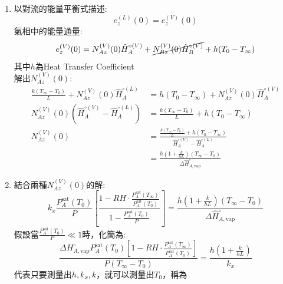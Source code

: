 \documentclass[../main.tex]{subfiles}
\begin{document}
\begin{itemize}
\begin{enumerate}
\begin{align}
        \frac{1 - RH \cdot \frac{P_A^{\text{sat}}(T_\infty)}{P_A^{\text{sat}}(T_0)}
      }{1 - \frac{P_A^{\text{sat}}(T_0)}{P}}
      \right] \label{eq:ch4_6_mass_thermal_N_Az_final}
    \end{align}
    \item 以對流的能量平衡式描述:
    \begin{equation}
      e_z^{(L)}(0) = e_z^{(V)}(0)
    \end{equation}
    氣相中的能量通量:
    \begin{equation}
      e_z^{(V)}(0) = N_{Az}^{(V)}(0) \hat H_A^{\circ (V)} + \cancel{N_{Bz}^{(V)}(0) \hat H_B^{\circ (V)}}
      + h(T_0 - T_\infty)
    \end{equation}
    其中$h$為Heat Transfer Coefficient\\
    解出$ N_{Az}^{(V)}(0)$:
    \begin{align}
      \frac{k(T_\infty - T_0)}{L} + N_{Az}^{(V)}(0)\hat H_A^{\circ (L)} 
      &=h(T_0 - T_\infty)+ N_{Az}^{(V)}(0) \hat H_A^{\circ (V)} \nonumber\\
      N_{Az}^{(V)}(0) \left(\hat H_A^{\circ (V)} - \hat H_A^{\circ (L)}\right)
      &= \frac{k(T_\infty - T_0)}{L} + h(T_0 - T_\infty) \nonumber\\
      N_{Az}^{(V)}(0) &= \frac{\frac{k(T_\infty - T_0)}{L} + h(T_0 - T_\infty)}
      {\hat H_A^{\circ (V)} - \hat H_A^{\circ (L)}} \nonumber\\
      &= \frac{h\left(
        1+\frac{k}{hL}
      \right)\left(
        T_\infty - T_0
      \right)}{\Delta \hat H_{A,\text{vap}}^{\circ}}
    \end{align}
    \item 結合兩種$N_{Az}^{(V)}(0)$的解:
    \begin{equation}
      \boxed{
        k_x \frac{P_A^{\text{sat}}(T_0)}{P} \left[
          \frac{1 - RH \cdot \frac{P_A^{\text{sat}}(T_\infty)}{P_A^{\text{sat}}(T_0)}
        }{1 - \frac{P_A^{\text{sat}}(T_0)}{P}}
        \right] = \frac{h\left(
          1+\frac{k}{hL}
        \right)\left(
          T_\infty - T_0
        \right)}{\Delta \hat H_{A,\text{vap}}^{\circ}}}
    \end{equation}
    假設當$\frac{P_A^{\text{sat}}(T_0)}{P} \ll 1$時，化簡為:
    \begin{equation}
      \boxed{
        \frac{\Delta H_{A,\text{vap}}^{\circ} P_A^{\text{sat}}(T_0)\left[
          1- RH \cdot \frac{P_A^{\text{sat}}(T_\infty)}{P_A^{\text{sat}}(T_0)}
        \right]}{P(T_\infty - T_0)} = \frac{h\left(
          1+\frac{k}{hL}\right)}{k_x}}
    \end{equation}
    代表只要測量出$h,k_x,k$，就可以測量出$T_0$，稱為
  \end{enumerate}
\end{itemize}
\end{document}
